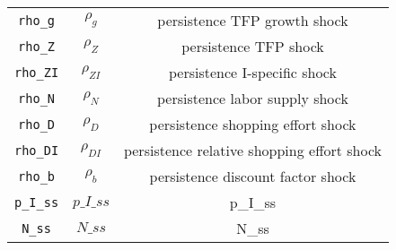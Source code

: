 \begin{center}
\begin{longtable}{ccc}
\texttt{rho\_g} & ${\rho_g}$ & persistence TFP growth shock\\
\texttt{rho\_Z} & ${\rho_Z}$ & persistence TFP shock\\
\texttt{rho\_ZI} & ${\rho_{ZI}}$ & persistence I-specific shock\\
\texttt{rho\_N} & ${\rho_N}$ & persistence labor supply shock\\
\texttt{rho\_D} & ${\rho_D}$ & persistence shopping effort shock\\
\texttt{rho\_DI} & ${\rho_{DI}}$ & persistence relative shopping effort shock\\
\texttt{rho\_b} & ${\rho_b}$ & persistence discount factor shock\\
\texttt{p\_I\_ss} & $p\_I\_ss$ & p\_I\_ss\\
\texttt{N\_ss} & $N\_ss$ & N\_ss\\
\hline%
\end{longtable}
\end{center}
